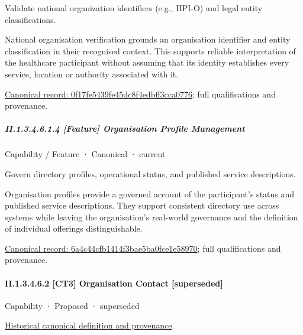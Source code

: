 Validate national organization identifiers (e.g., HPI-O) and legal entity classifications.



National organisation verification grounds an organisation identifier and entity classification in their recognised context. This supports reliable interpretation of the healthcare participant without assuming that its identity establishes every service, location or authority associated with it.


{\footnotesize \href{../../../../../../../continuum/strategy/capability/feature/0f17fe5439fe45dc8f4edbff3cca0776.md}{Canonical record: 0f17fe5439fe45dc8f4edbff3cca0776}; full qualifications and provenance.}\par
\subparagraph*{II.1.3.4.6.1.4 [Feature] Organisation Profile Management}
\label{navigation:II.1.3.4.6.1.4}

\label{element:6a4c44cfb1414f3bae5ba0fce1e58970}
{\small Capability / Feature · Canonical · current}\par

Govern directory profiles, operational status, and published service descriptions.



Organisation profiles provide a governed account of the participant's status and published service descriptions. They support consistent directory use across systems while leaving the organisation's real-world governance and the definition of individual offerings distinguishable.


{\footnotesize \href{../../../../../../../continuum/strategy/capability/feature/6a4c44cfb1414f3bae5ba0fce1e58970.md}{Canonical record: 6a4c44cfb1414f3bae5ba0fce1e58970}; full qualifications and provenance.}\par
\paragraph*{II.1.3.4.6.2 [CT3] Organisation Contact [superseded]}
\label{navigation:II.1.3.4.6.2}

\label{element:b7f5108880eb429bb407c87a37b0e23f}
{\small Capability · Proposed · superseded}\par
\href{../../../../../../../continuum/strategy/capability/b7f5108880eb429bb407c87a37b0e23f.md}{Historical canonical definition and provenance}.\par
